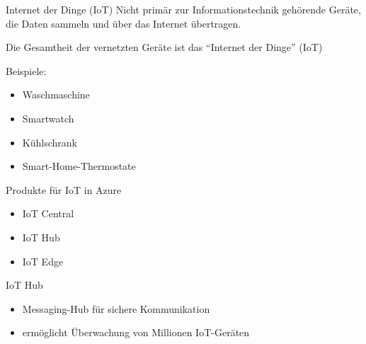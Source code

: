 
\begin{flashcard}[Definition]{Internet der Dinge (IoT)}
    Nicht primär zur Informationstechnik gehörende Geräte, die Daten sammeln und über das Internet übertragen.

    \vspace{5mm}
    Die Gesamtheit der vernetzten Geräte ist das ``Internet der Dinge'' (IoT)

    \vspace{5mm}
    Beispiele:
    \begin{itemize}
        \item Waschmaschine
        \item Smartwatch
        \item Kühlschrank
        \item Smart-Home-Thermostate
    \end{itemize}

\end{flashcard}

\begin{flashcard}[\ ]{Produkte für IoT in Azure}
    \begin{itemize}
        \item IoT Central
        \item IoT Hub
        \item IoT Edge
    \end{itemize}

\end{flashcard}

\begin{flashcard}[Definition]{IoT Hub}
    \begin{itemize}
        \item Messaging-Hub für sichere Kommunikation
        \item ermöglicht Überwachung von Millionen IoT-Geräten
    \end{itemize}
\end{flashcard}

